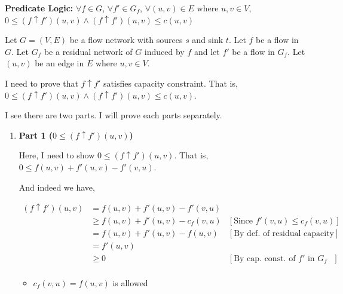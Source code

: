 \documentclass[12pt]{article}
\begin{document}
\begin{enumerate}[1.]
\begin{itemize}
        \bigskip

        \textbf{Predicate Logic:} $\forall f \in G$, $\forall f' \in G_f$, $\forall (u,v) \in E \text{ where $u,v \in V$}$,
        $0 \leq (f \uparrow f')(u,v) \land (f \uparrow f')(u,v) \leq c(u,v)$

        \bigskip

        Let $G = (V,E)$ be a flow network with sources $s$ and sink $t$. Let $f$
        be a flow in $G$. Let $G_f$ be a residual network of $G$ induced by $f$ and let $f'$ be
        a flow in $G_f$. Let $(u,v)$ be an edge in $E$ where $u,v \in V$.

        \bigskip

        I need to prove that $f \uparrow f'$ satisfies capacity constraint. That is,
        $0 \leq (f \uparrow f')(u,v) \land (f \uparrow f')(u,v) \leq c(u,v)$.

        \bigskip

        I see there are two parts. I will prove each parts separately.

        \bigskip

        \begin{enumerate}[1.]
            \item \textbf{Part 1 ($0 \leq (f \uparrow f')(u,v)$)}

            \bigskip

            Here, I need to show $0 \leq (f \uparrow f')(u,v)$. That is,
            $0 \leq f(u,v) + f'(u,v) - f'(v,u)$.

            \bigskip

            And indeed we have,

            \begin{align}
            (f \uparrow f')(u,v) &= f(u,v)+ f'(u,v) - f'(v,u)\\
            &\geq f(u,v)+ f'(u,v) - c_f(v,u) & [\text{Since $f'(v,u) \leq c_f(v,u)$}]\\
            &= f(u,v)+ f'(u,v) - f(u,v) & [\text{By def. of residual capacity}]\\
            &= f'(u,v)\\
            &\geq 0 & [\text{By cap. const. of $f'$ in $G_f$ }]\\
            \end{align}

            \bigskip

            \begin{itemize}
                \item \color{red}$c_f(v,u) = f(u,v)$ is allowed\color{black}
            \end{itemize}


\end{enumerate}
\end{itemize}
\end{enumerate}
\end{document}
